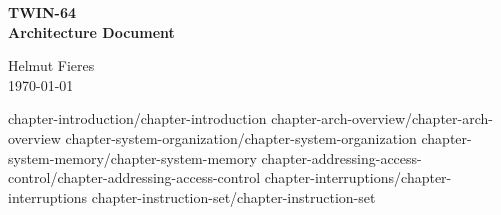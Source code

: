 \documentclass[a4paper,11pt]{book}
\begin{document}
	
    \setlength{\emergencystretch}{3em}
    \raggedbottom
     
  	\pagestyle{empty}
    \begin{center}
    		    			
     	{\Huge \textbf{TWIN-64}} \\
      	{\LARGE \textbf{Architecture Document}} 

      	\vspace{2cm}

      	{\LARGE Helmut Fieres} \\
      	{\large \today}
    \end{center}
		
   	\frontmatter 
    \pagestyle{fancy}      
	\tableofcontents   
	\markboth{ } { }
		
	\mainmatter   
    \pagestyle{fancy}
    
     {chapter-introduction/chapter-introduction}
     {chapter-arch-overview/chapter-arch-overview}
     {chapter-system-organization/chapter-system-organization}
     {chapter-system-memory/chapter-system-memory}
     {chapter-addressing-access-control/chapter-addressing-access-control}
     {chapter-interruptions/chapter-interruptions}
     {chapter-instruction-set/chapter-instruction-set}
  
    \appendix 
    

    \backmatter             
\end{document}
